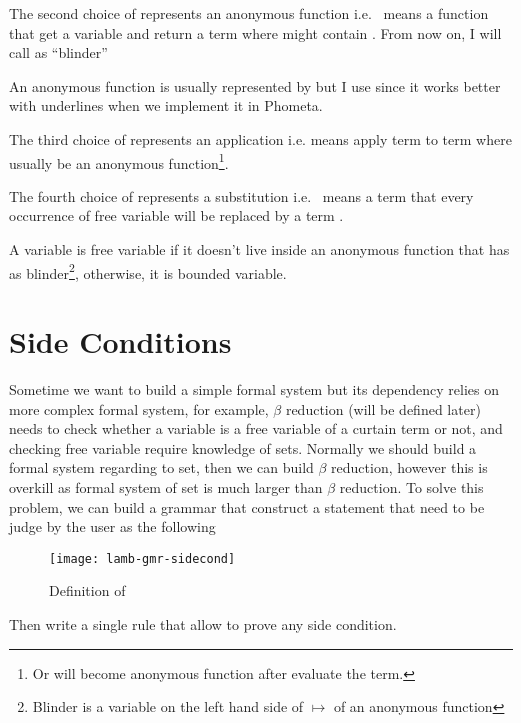 \documentclass[master.tex]{subfiles}
\begin{document}
The second choice of  represents an anonymous function i.e.\
 means a function that get a variable  and return a
term  where \pvar{M} might contain \pvar{x}. From now on, I will call as
``blinder''

An anonymous function is usually represented by  but I use
\term{lamb-etc-1} since it works better with underlines when we implement it in
Phometa.

The third choice of  represents an application i.e. 
means apply term  to term \pvar{N} where \pvar{M} usually be an
anonymous function\footnote{Or will become anonymous function after evaluate the
  term.}.

The fourth choice of  represents a substitution i.e.\
 means a term  that every occurrence of free variable
 will be replaced by a term \pvar{N}.

A variable  is free variable if it doesn't live inside an anonymous function
that has \pvar{x} as blinder\footnote{Blinder is a variable on the left hand side
of $\mapsto$ of an anonymous function}, otherwise, it is bounded variable.



\section{Side Conditions}
Sometime we want to build a simple formal system but its dependency relies on
more complex formal system, for example, $\beta$ reduction (will be defined
later) needs to check whether a variable is a free variable of a curtain term or
not, and checking free variable require knowledge of sets. Normally we should
build a formal system regarding to set, then we can build $\beta$ reduction,
however this is overkill as formal system of set is much larger than $\beta$
reduction. To solve this problem, we can build a grammar that construct a
statement that need to be judge by the user as the following

\begin{figure}[H]
    \centering
\begin{minipage}{0.7\textwidth}
    \texttt{[image: lamb-gmr-sidecond]}
\end{minipage}
\caption{Definition of }
\end{figure}

Then write a single rule that allow to prove any side condition.
\end{document}

